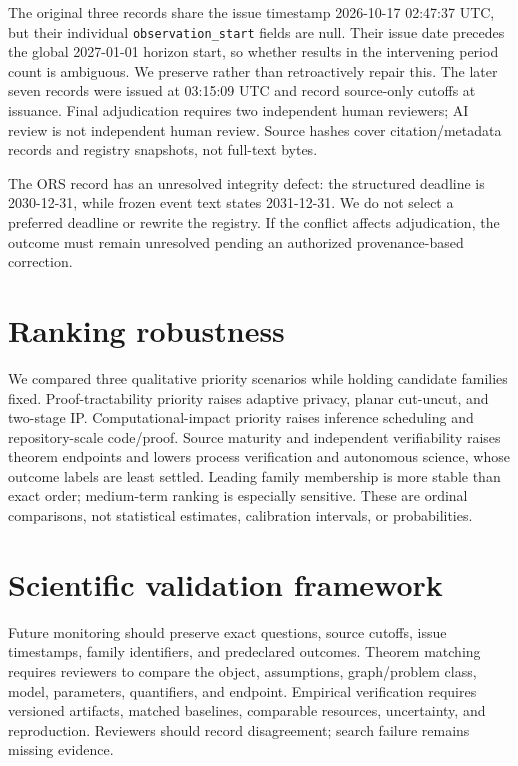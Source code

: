 \documentclass[11pt]{article}
\begin{document}
The original three records share the issue timestamp 2026-10-17 02:47:37 UTC, but their individual \texttt{observation\_start} fields are null. Their issue date precedes the global 2027-01-01 horizon start, so whether results in the intervening period count is ambiguous. We preserve rather than retroactively repair this. The later seven records were issued at 03:15:09 UTC and record source-only cutoffs at issuance. Final adjudication requires two independent human reviewers; AI review is not independent human review. Source hashes cover citation/metadata records and registry snapshots, not full-text bytes.

The ORS record has an unresolved integrity defect: the structured deadline is 2030-12-31, while frozen event text states 2031-12-31. We do not select a preferred deadline or rewrite the registry. If the conflict affects adjudication, the outcome must remain unresolved pending an authorized provenance-based correction.

\section{Ranking robustness}
We compared three qualitative priority scenarios while holding candidate families fixed. Proof-tractability priority raises adaptive privacy, planar cut-uncut, and two-stage IP. Computational-impact priority raises inference scheduling and repository-scale code/proof. Source maturity and independent verifiability raises theorem endpoints and lowers process verification and autonomous science, whose outcome labels are least settled. Leading family membership is more stable than exact order; medium-term ranking is especially sensitive. These are ordinal comparisons, not statistical estimates, calibration intervals, or probabilities.

\section{Scientific validation framework}
Future monitoring should preserve exact questions, source cutoffs, issue timestamps, family identifiers, and predeclared outcomes. Theorem matching requires reviewers to compare the object, assumptions, graph/problem class, model, parameters, quantifiers, and endpoint. Empirical verification requires versioned artifacts, matched baselines, comparable resources, uncertainty, and reproduction. Reviewers should record disagreement; search failure remains missing evidence.
\end{document}
